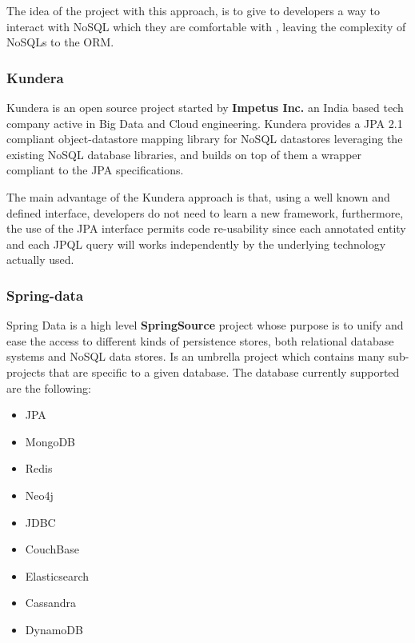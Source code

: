 \noindent The idea of the project with this approach, is to give to developers a way to interact with NoSQL which they are comfortable with , leaving the complexity of NoSQLs to the ORM.

\subsubsection{Kundera}
Kundera is an open source project started by \textbf{Impetus Inc.} an India based tech company active in Big Data and Cloud engineering.
Kundera provides a JPA 2.1 compliant object-datastore mapping library for NoSQL datastores leveraging the existing NoSQL database libraries, and builds on top of them a wrapper compliant to the JPA specifications.

\noindent The main advantage of the Kundera approach is that, using a well known and defined interface, developers do not need to learn a new framework, furthermore, the use of the JPA interface permits code re-usability since each annotated entity and each JPQL query will works independently by the underlying technology actually used.

\subsubsection{Spring-data}
Spring Data \cite{online:spring-data} is a high level \textbf{SpringSource} project whose purpose is to unify and ease the access to different kinds of persistence stores, both relational database systems and NoSQL data stores. Is an umbrella project which contains many sub-projects that are specific to a given database. The database currently supported are the following:
\begin{itemize}
\item JPA
\item MongoDB
\item Redis
\item Neo4j
\item JDBC
\item CouchBase
\item Elasticsearch
\item Cassandra
\item DynamoDB
\end{itemize}

